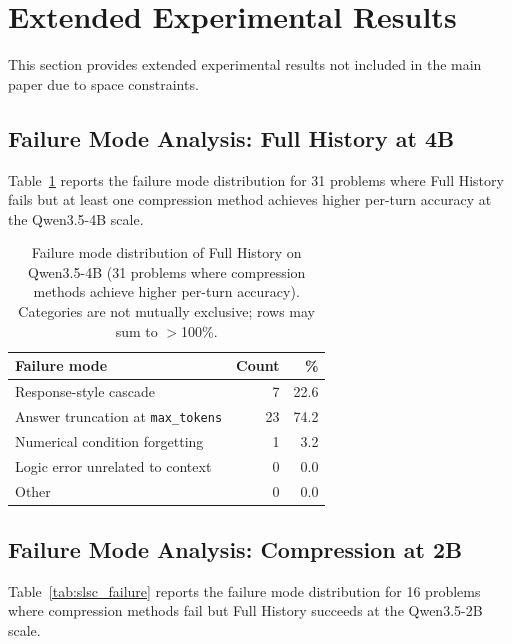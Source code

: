 \section{Extended Experimental Results}
\label{app:results}

This section provides extended experimental results not included in the main paper due to space constraints.

\subsection{Failure Mode Analysis: Full History at 4B}
\label{app:fh_failure}

Table~\ref{tab:fh_failure} reports the failure mode distribution for 31 problems where Full History fails but at least one compression method achieves higher per-turn accuracy at the Qwen3.5-4B scale.

\begin{table}[h]
\centering
\small
\caption{Failure mode distribution of Full History on Qwen3.5-4B (31 problems where compression methods achieve higher per-turn accuracy). Categories are not mutually exclusive; rows may sum to $>$100\%.}
\label{tab:fh_failure}
\begin{tabular}{lrr}
  \toprule
  \textbf{Failure mode} & \textbf{Count} & \textbf{\%} \\
  \midrule
  Response-style cascade                   & 7  & 22.6 \\
  Answer truncation at \texttt{max\_tokens} & 23 & 74.2 \\
  Numerical condition forgetting           & 1  &  3.2 \\
  Logic error unrelated to context         & 0  &  0.0 \\
  Other                                    & 0  &  0.0 \\
  \bottomrule
\end{tabular}
\end{table}

\subsection{Failure Mode Analysis: Compression at 2B}
\label{app:slsc_failure}

Table~\ref{tab:slsc_failure} reports the failure mode distribution for 16 problems where compression methods fail but Full History succeeds at the Qwen3.5-2B scale.

